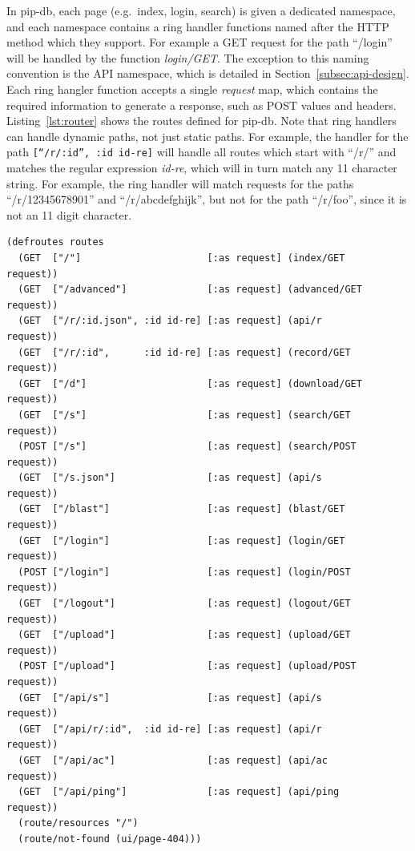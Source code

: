 In pip-db, each page (e.g.\ index, login, search) is given a dedicated
namespace, and each namespace contains a ring handler functions named
after the HTTP method which they support. For example a GET request
for the path ``/login'' will be handled by the function
\textit{login/GET}. The exception to this naming convention is the API
namespace, which is detailed in Section~\ref{subsec:api-design}. Each
ring hangler function accepts a single \textit{request} map, which
contains the required information to generate a response, such as POST
values and headers. Listing~\ref{lst:router} shows the routes defined
for pip-db. Note that ring handlers can handle dynamic paths, not just
static paths. For example, the handler for the path
\texttt{[``/r/:id'', :id id-re]} will handle all routes which start
with ``/r/'' and matches the regular expression \textit{id-re}, which
will in turn match any 11 character string. For example, the ring
handler will match requests for the paths ``/r/12345678901'' and
``/r/abcdefghijk'', but not for the path ``/r/foo'', since it is not
an 11 digit character.

\br{}


\lstset{language=clojure}
\begin{lstlisting}[label=lst:router,caption={%
      [Application ring handler routes]
      Application ring handler routes, taken from \texttt{middleware.clj}.}]
(defroutes routes
  (GET  ["/"]                      [:as request] (index/GET       request))
  (GET  ["/advanced"]              [:as request] (advanced/GET    request))
  (GET  ["/r/:id.json", :id id-re] [:as request] (api/r           request))
  (GET  ["/r/:id",      :id id-re] [:as request] (record/GET      request))
  (GET  ["/d"]                     [:as request] (download/GET    request))
  (GET  ["/s"]                     [:as request] (search/GET      request))
  (POST ["/s"]                     [:as request] (search/POST     request))
  (GET  ["/s.json"]                [:as request] (api/s           request))
  (GET  ["/blast"]                 [:as request] (blast/GET       request))
  (GET  ["/login"]                 [:as request] (login/GET       request))
  (POST ["/login"]                 [:as request] (login/POST      request))
  (GET  ["/logout"]                [:as request] (logout/GET      request))
  (GET  ["/upload"]                [:as request] (upload/GET      request))
  (POST ["/upload"]                [:as request] (upload/POST     request))
  (GET  ["/api/s"]                 [:as request] (api/s           request))
  (GET  ["/api/r/:id",  :id id-re] [:as request] (api/r           request))
  (GET  ["/api/ac"]                [:as request] (api/ac          request))
  (GET  ["/api/ping"]              [:as request] (api/ping        request))
  (route/resources "/")
  (route/not-found (ui/page-404)))
\end{lstlisting}

